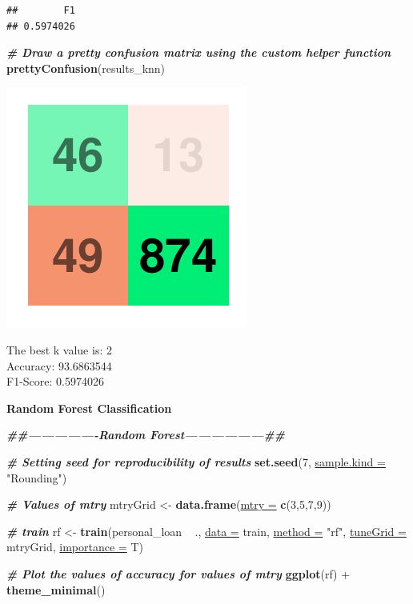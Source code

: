 \documentclass[
]{article}
\newenvironment{Shaded}{\begin{snugshade}}{\end{snugshade}}
\newcommand{\CommentTok}[1]{\textcolor[rgb]{0.00,0.40,1.00}{\textbf{\textit{#1}}}}
\newcommand{\DataTypeTok}[1]{\textcolor[rgb]{0.74,0.68,0.62}{\underline{#1}}}
\newcommand{\DecValTok}[1]{\textcolor[rgb]{0.27,0.67,0.26}{#1}}
\newcommand{\KeywordTok}[1]{\textcolor[rgb]{0.26,0.66,0.93}{\textbf{#1}}}
\newcommand{\NormalTok}[1]{\textcolor[rgb]{0.74,0.68,0.62}{#1}}
\newcommand{\OperatorTok}[1]{\textcolor[rgb]{0.74,0.68,0.62}{#1}}
\newcommand{\StringTok}[1]{\textcolor[rgb]{0.02,0.61,0.04}{#1}}
\begin{document}
\begin{verbatim}
##        F1 
## 0.5974026
\end{verbatim}

\begin{Shaded}
\begin{Highlighting}[]
\CommentTok{# Draw a pretty confusion matrix using the custom helper function}
\KeywordTok{prettyConfusion}\NormalTok{(results_knn)}
\end{Highlighting}
\end{Shaded}

\includegraphics{Bank_Loan_Classification_files/figure-latex/unnamed-chunk-34-1.pdf}

The best k value is: 2\\
Accuracy: 93.6863544\\
F1-Score: 0.5974026

\textbf{Random Forest Classification}

\begin{Shaded}
\begin{Highlighting}[]
\CommentTok{##----------------Random Forest------------------##}

\CommentTok{# Setting seed for reproducibility of results}
\KeywordTok{set.seed}\NormalTok{(}\DecValTok{7}\NormalTok{, }\DataTypeTok{sample.kind =} \StringTok{"Rounding"}\NormalTok{)}

\CommentTok{# Values of mtry}
\NormalTok{mtryGrid <-}\StringTok{ }\KeywordTok{data.frame}\NormalTok{(}\DataTypeTok{mtry =} \KeywordTok{c}\NormalTok{(}\DecValTok{3}\NormalTok{,}\DecValTok{5}\NormalTok{,}\DecValTok{7}\NormalTok{,}\DecValTok{9}\NormalTok{))}

\CommentTok{# train}
\NormalTok{rf <-}\StringTok{  }\KeywordTok{train}\NormalTok{(personal_loan }\OperatorTok{~}\StringTok{ }\NormalTok{., }\DataTypeTok{data =}\NormalTok{ train, }\DataTypeTok{method =} \StringTok{"rf"}\NormalTok{,}
             \DataTypeTok{tuneGrid =}\NormalTok{ mtryGrid, }\DataTypeTok{importance =}\NormalTok{ T)}

\CommentTok{# Plot the values of accuracy for values of mtry}
\KeywordTok{ggplot}\NormalTok{(rf) }\OperatorTok{+}\StringTok{ }\KeywordTok{theme_minimal}\NormalTok{()}
\end{Highlighting}
\end{Shaded}
\end{document}
